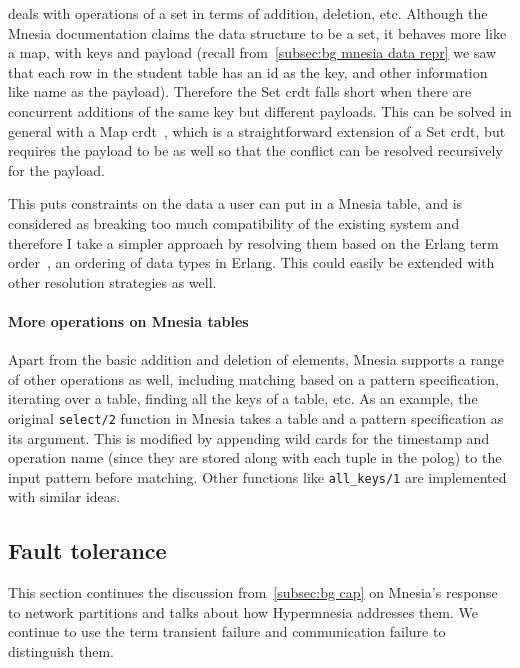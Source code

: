  deals with operations of a set in terms of addition, deletion,
etc. Although the Mnesia documentation claims the data structure to be a set,
it behaves more like a map, with keys and payload 
(recall from~\cref{subsec:bg mnesia data repr} we saw that each row in the student 
table has an id as the key, and other information like name as the payload). 
Therefore the Set \acrshort{crdt}
falls short when there are concurrent additions of the same key but different
payloads. This can be solved in general with a Map \acrshort{crdt}~\cite{shapiro2011CRDT}, 
which is a straightforward extension of a Set \acrshort{crdt}, but requires the
payload to be  as well so that the conflict can be resolved
recursively for the payload.

This puts constraints on the data a user can put in a Mnesia table, and
is considered as breaking too much compatibility of the existing system and therefore
I take a simpler approach by resolving them based on the Erlang term 
order~\cite{ericssonab2023refmanual}, an ordering of data types in Erlang.
This could easily be extended with other resolution strategies as well.


\paragraph{More operations on Mnesia tables}

Apart from the basic addition and deletion of elements, Mnesia 
supports a range of other operations as well, including
matching based on a pattern specification, iterating over a table, finding all
the keys of a table, etc. As an example, the original \verb|select/2| function
in Mnesia takes a table and a pattern specification as its argument. This is
modified by appending wild cards for the timestamp and operation name (since they
are stored along with each tuple in the \acrshort{polog}) to the input pattern 
before matching. Other functions like \verb|all_keys/1| are implemented with
similar ideas.


\subsection{Fault tolerance} \label{sec:impl fault tolerance}

This section continues the discussion from~\cref{subsec:bg cap} on Mnesia's response
to network partitions and talks about how Hypermnesia addresses them. We continue
to use the term transient failure and communication failure to distinguish them.

